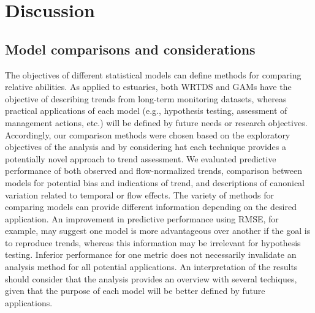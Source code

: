 \documentclass[letterpaper,12pt,oneside]{article}\usepackage[]{graphicx}\usepackage[]{color}
\begin{document}
\section{Discussion}

\subsection{Model comparisons and considerations}

The objectives of different statistical models can define methods for comparing relative abilities.  As applied to estuaries, both \ac{WRTDS} and \acp{GAM} have the objective of describing trends from long-term monitoring datasets, whereas practical applications of each model (e.g., hypothesis testing, assessment of management actions, etc.) will be defined by future needs or research objectives.  Accordingly, our comparison methods were chosen based on the exploratory objectives of the analysis and by considering hat each technique provides a potentially novel approach to trend assessment.  We evaluated predictive performance of both observed and flow-normalized trends, comparison between models for potential bias and indications of trend, and descriptions of canonical variation related to temporal or flow effects.  The variety of methods for comparing models can provide different information depending on the desired application.  An improvement in predictive performance using \ac{RMSE}, for example, may suggest one model is more advantageous over another if the goal is to reproduce trends, whereas this information may be irrelevant for hypothesis testing. Inferior performance for one metric does not necessarily invalidate an analysis method for all potential applications.  An interpretation of the results should consider that the analysis provides an overview with several techiques, given that the purpose of each model will be better defined by future applications. 
\end{document}
